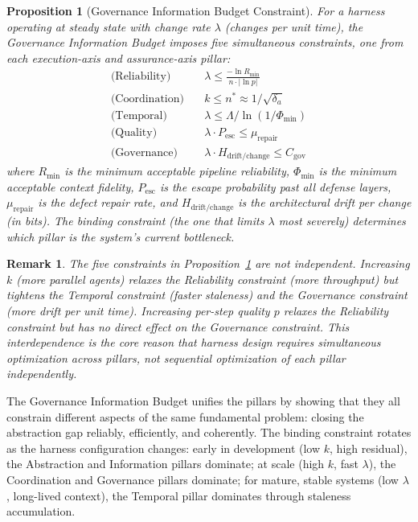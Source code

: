 \documentclass[11pt, a4paper]{googledeepmind}
\newtheorem{proposition}{Proposition}[section]
\newtheorem*{remark}{Remark}
\begin{document}
\begin{proposition}[Governance Information Budget Constraint]
\label{prop:gib-constraint}
For a harness operating at steady state with change rate $\lambda$ (changes per unit time), the Governance Information Budget imposes five simultaneous constraints, one from each execution-axis and assurance-axis pillar:
\begin{align}
    \text{(Reliability)} &\quad \lambda \leq \frac{-\ln R_{\min}}{n \cdot |\ln p|} \label{eq:gib-rel} \\
    \text{(Coordination)} &\quad k \leq n^* \approx 1/\sqrt{\delta_a} \label{eq:gib-coord} \\
    \text{(Temporal)} &\quad \lambda \leq \Lambda / \ln(1/\Phi_{\min}) \label{eq:gib-temp} \\
    \text{(Quality)} &\quad \lambda \cdot P_{\text{esc}} \leq \mu_{\text{repair}} \label{eq:gib-qual} \\
    \text{(Governance)} &\quad \lambda \cdot H_{\text{drift/change}} \leq C_{\text{gov}} \label{eq:gib-gov}
\end{align}
where $R_{\min}$ is the minimum acceptable pipeline reliability, $\Phi_{\min}$ is the minimum acceptable context fidelity, $P_{\text{esc}}$ is the escape probability past all defense layers, $\mu_{\text{repair}}$ is the defect repair rate, and $H_{\text{drift/change}}$ is the architectural drift per change (in bits). The binding constraint (the one that limits $\lambda$ most severely) determines which pillar is the system's current bottleneck.
\end{proposition}

\begin{remark}
The five constraints in Proposition~\ref{prop:gib-constraint} are not independent. Increasing $k$ (more parallel agents) relaxes the Reliability constraint (more throughput) but tightens the Temporal constraint (faster staleness) and the Governance constraint (more drift per unit time). Increasing per-step quality $p$ relaxes the Reliability constraint but has no direct effect on the Governance constraint. This interdependence is the core reason that harness design requires simultaneous optimization across pillars, not sequential optimization of each pillar independently.
\end{remark}

The Governance Information Budget unifies the pillars by showing that they all constrain different aspects of the same fundamental problem: closing the abstraction gap reliably, efficiently, and coherently. The binding constraint rotates as the harness configuration changes: early in development (low $k$, high residual), the Abstraction and Information pillars dominate; at scale (high $k$, fast $\lambda$), the Coordination and Governance pillars dominate; for mature, stable systems (low $\lambda$, long-lived context), the Temporal pillar dominates through staleness accumulation.
\end{document}
